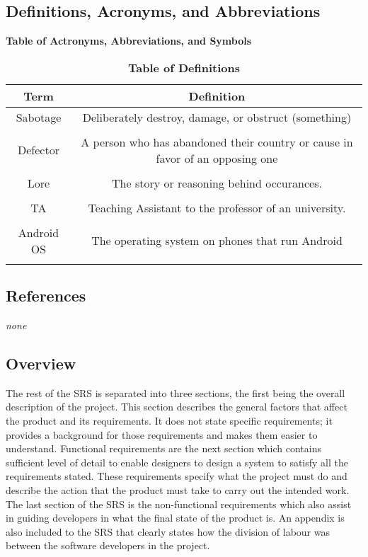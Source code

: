 \documentclass[12pt, titlepage]{article}
\newcommand\tab[1][1cm]{\hspace*{#1}}
\begin{document}
\subsection{Definitions, Acronyms, and Abbreviations}
\label{sub:definitions_acronyms_and_abbreviations}
\begin{table}[h!]
\centering
\caption{\bf Table of Actronyms, Abbreviations, and Symbols}


\centering
\caption{\bf Table of Definitions}

\begin{tabular}{|c|c|}
\hline
{\bf Term} & {\bf Definition}\\
\hline
{Sabotage} & {Deliberately destroy, damage, or obstruct (something)}\\
{} & {}\\
\hline
{Defector} & {A person who has abandoned their country or cause in favor of an opposing one}\\
{} & {}\\
\hline
{Lore} & {The story or reasoning behind occurances. }\\
{} & {}\\
\hline
{TA} & {Teaching Assistant to the professor of an university.}\\
{} & {}\\
\hline
{Android OS} & {The operating system on phones that run Android}\\
{} & {}\\
\hline
\end{tabular}

\end{table}
\newpage
\subsection{References}
\label{sub:references}
\emph{none}

\subsection{Overview}
\label{sub:overview}
\tab The rest of the SRS is separated into three sections, the first being the overall description of the project. This section describes the general factors that affect the product and its requirements. It does not state specific requirements; it provides a background for those requirements and makes them easier to understand. Functional requirements are the next section which contains sufficient level of detail to enable designers to design a system to satisfy all the requirements stated. These requirements specify what the project must do and describe the action that the product must take to carry out the intended work. The last section of the SRS is the non-functional requirements which also assist in guiding developers in what the final state of the product is. An appendix is also included to the SRS that clearly states how the division of labour was between the software developers in the project.
\end{document}
